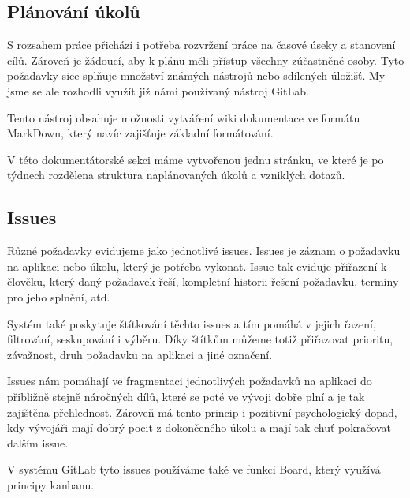 \documentclass[czech,BP]{thesiskiv}
\begin{document}
\subsection{Plánování úkolů}
	\par S rozsahem práce přichází i potřeba rozvržení práce na časové úseky a stanovení cílů. Zároveň je žádoucí, aby k plánu měli přístup všechny zúčastněné osoby. Tyto požadavky sice splňuje množství známých nástrojů nebo sdílených úložišť. My jsme se ale rozhodli využít již námi používaný nástroj GitLab.
	\par Tento nástroj obsahuje možnosti vytváření wiki dokumentace ve formátu MarkDown, který navíc zajišťuje základní formátování.
	\par V této dokumentátorské sekci máme vytvořenou jednu stránku, ve které je po týdnech rozdělena struktura naplánovaných úkolů a vzniklých dotazů.
\subsection{Issues}
	\par Různé požadavky evidujeme jako jednotlivé issues. Issues je záznam o požadavku na aplikaci nebo úkolu, který je potřeba vykonat. Issue tak eviduje přiřazení k člověku, který daný požadavek řeší, kompletní historii řešení požadavku, termíny pro jeho splnění, atd.
	\par Systém také poskytuje štítkování těchto issues a tím pomáhá v jejich řazení, filtrování, seskupování i výběru. Díky štítkům můžeme totiž přiřazovat prioritu, závažnost, druh požadavku na aplikaci a jiné označení.
	\par Issues nám pomáhají ve fragmentaci  jednotlivých požadavků na aplikaci do přibližně stejně náročných dílů, které se poté ve vývoji dobře plní a je tak zajištěna přehlednost. Zároveň má tento princip i pozitivní psychologický dopad, kdy vývojáři mají dobrý pocit z dokončeného úkolu a mají tak chuť pokračovat dalším issue.
	\par V systému GitLab tyto issues používáme také ve funkci Board, který využívá principy kanbanu.
\end{document}
